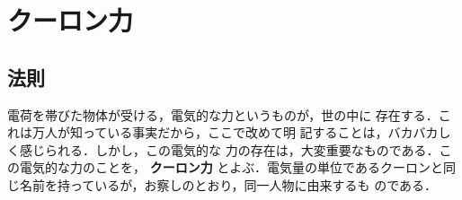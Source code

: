     \section{クーロン力}\label{sec:CoulomnbForce}
    \subsection{法則}
        電荷を帯びた物体が受ける，電気的な力というものが，世の中に
        存在する．これは万人が知っている事実だから，ここで改めて明
        記することは，バカバカしく感じられる．しかし，この電気的な
        力の存在は，大変重要なものである．この電気的な力のことを，
        \textbf{クーロン力} とよぶ．電気量の単位であるクーロンと同
        じ名前を持っているが，お察しのとおり，同一人物に由来するも
        のである．

